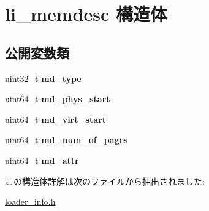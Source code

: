 \hypertarget{structli__memdesc}{}\section{li\+\_\+memdesc 構造体}
\label{structli__memdesc}
\subsection*{公開変数類}
\begin{DoxyCompactItemize}
\item 
\hypertarget{structli__memdesc_a39167d86533df726f0517b89dc33c494}{}\label{structli__memdesc_a39167d86533df726f0517b89dc33c494} 
uint32\+\_\+t {\bfseries md\+\_\+type}
\item 
\hypertarget{structli__memdesc_a551f2c14e7e093a92a0b320a58d07026}{}\label{structli__memdesc_a551f2c14e7e093a92a0b320a58d07026} 
uint64\+\_\+t {\bfseries md\+\_\+phys\+\_\+start}
\item 
\hypertarget{structli__memdesc_ab1bd6cd10e7e052250725b6ddeea8ade}{}\label{structli__memdesc_ab1bd6cd10e7e052250725b6ddeea8ade} 
uint64\+\_\+t {\bfseries md\+\_\+virt\+\_\+start}
\item 
\hypertarget{structli__memdesc_a6ce3696143305422f2505bf65b6303d2}{}\label{structli__memdesc_a6ce3696143305422f2505bf65b6303d2} 
uint64\+\_\+t {\bfseries md\+\_\+num\+\_\+of\+\_\+pages}
\item 
\hypertarget{structli__memdesc_a1baaa66ccbe9d119665e3352d30c7ee3}{}\label{structli__memdesc_a1baaa66ccbe9d119665e3352d30c7ee3} 
uint64\+\_\+t {\bfseries md\+\_\+attr}
\end{DoxyCompactItemize}


この構造体詳解は次のファイルから抽出されました\+:\begin{DoxyCompactItemize}
\item 
\hyperlink{loader__info_8h}{loader\+\_\+info.\+h}\end{DoxyCompactItemize}
